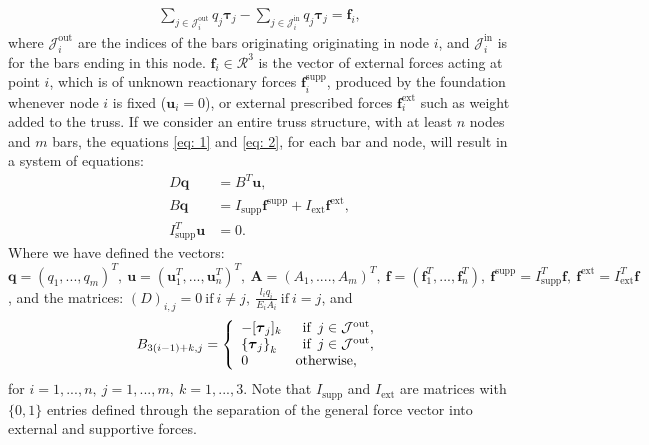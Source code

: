 \documentclass[10pt,a4paper]{article}
\begin{document}
\begin{align}
\sum_{j\in\mathcal{J}_i^{\text{out}}}q_j\boldsymbol{\tau}_j-\sum_{j\in\mathcal{J}_i^{\text{in}}}q_j\boldsymbol{\tau}_j = \boldsymbol{f}_i \label{eq: 2},
\end{align}
where $\mathcal{J}_i^{\text{out}}$ are the indices of the bars originating originating in node $i$, and $\mathcal{J}_i^{\text{in}}$ is for the bars ending in this node. $\boldsymbol{f}_i\in\mathcal{R}^3$ is the vector of external forces acting at point $i$, which is of unknown reactionary forces $\boldsymbol{f}_i^{\text{supp}}$, produced by the foundation whenever node $i$ is fixed ($\boldsymbol{u}_i = 0$), or external prescribed forces $\boldsymbol{f}_i^{\text{ext}}$ such as weight added to the truss.
\newpage
\noindent
If we consider an entire truss structure, with at least $n$ nodes and $m$ bars, the equations \eqref{eq: 1} and \eqref{eq: 2}, for each bar and node, will result in a system of equations:
\begin{align}
\label{datsystem}
D \boldsymbol{q} &= B^T\boldsymbol{u},\\
B \boldsymbol{q} &= I_\text{supp}\boldsymbol{f}^{\text{supp}}+I_\text{ext}\boldsymbol{f}^{\text{ext}},\\
I_\text{supp}^T\boldsymbol{u} &= 0.
\end{align}
Where we have defined the vectors: $\boldsymbol{q} = (q_1,...,q_m)^T,\ \boldsymbol{u} = (\boldsymbol{u}_1^T,...,\boldsymbol{u}_n^T)^T,\ \boldsymbol{A}=(A_1,....,A_m)^T, \ \boldsymbol{f} = (\boldsymbol{f}_1^T,...,\boldsymbol{f}_n^T),\ \boldsymbol{f}^{\text{supp}} = I_\text{supp}^T\boldsymbol{f}, \ \boldsymbol{f}^{\text{ext}} = I_\text{ext}^T\boldsymbol{f}$, and the matrices: $(D)_{i,j} = 0 \ \text{if} \ i\neq j,\ \frac{l_i q_i}{E_i A_i} \ \text{if} \ i=j$, and
\begin{align}
B_{3(i-1)+k,j} = \left\lbrace 
\begin{array}{l l l l}
-[ \boldsymbol{\tau}_j]_k & \enspace \text{if} \enspace j \in \mathcal{J}^\text{out},\\
\left\lbrace \boldsymbol{\tau}_j\right\rbrace_k & \enspace \text{if} \enspace j \in \mathcal{J}^\text{out},\\
0 & \text{otherwise},
\end{array}\right.
\end{align}
for $i=1,...,n, \ j=1,...,m, \ k=1,...,3$. Note that $I_\text{supp}$ and $I_\text{ext}$ are matrices with $\{0,1\}$ entries defined through the separation of the general force vector into external and supportive forces.
\end{document}
